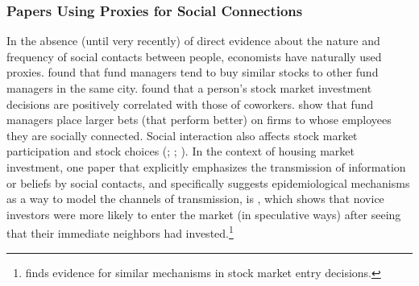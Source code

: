 
\hypertarget{proxies}{}
\subsubsection{Papers Using Proxies for Social Connections}\label{subsubsec:proxies}

In the absence (until very recently) of direct evidence about the nature and frequency of social contacts between people, economists have naturally used proxies.    \href{http://www.columbia.edu/~hh2679/ThyNeighborJF.pdf}{\cite{hong2005thy}} found that fund managers tend to buy similar stocks to other fund managers in the same city.  found that a person's stock market investment decisions are positively correlated with those of coworkers.   show that fund managers place larger bets (that perform better) on firms to whose employees they are socially connected.  Social interaction also affects stock market participation and stock choices (; ;  ). %
In the context of housing market investment, one paper that explicitly emphasizes the transmission of information or beliefs by social contacts, and specifically suggests epidemiological mechanisms as a way to model the channels of transmission, is
, which shows that novice investors were more likely to enter the market (in speculative ways) after seeing that their immediate neighbors had invested.\footnote{\cite{kaustia2012peer} finds evidence for similar mechanisms in stock market entry decisions.}


